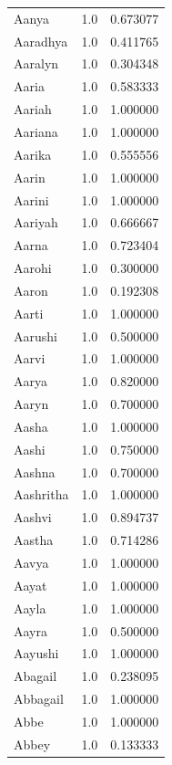 \documentclass[
  letterpaper,
  DIV=11,
  numbers=noendperiod]{scrreprt}
\begin{document}
\begin{tabular}{lrr}
Aanya           &   1.0 &   0.673077 \\
Aaradhya        &   1.0 &   0.411765 \\
Aaralyn         &   1.0 &   0.304348 \\
Aaria           &   1.0 &   0.583333 \\
Aariah          &   1.0 &   1.000000 \\
Aariana         &   1.0 &   1.000000 \\
Aarika          &   1.0 &   0.555556 \\
Aarin           &   1.0 &   1.000000 \\
Aarini          &   1.0 &   1.000000 \\
Aariyah         &   1.0 &   0.666667 \\
Aarna           &   1.0 &   0.723404 \\
Aarohi          &   1.0 &   0.300000 \\
Aaron           &   1.0 &   0.192308 \\
Aarti           &   1.0 &   1.000000 \\
Aarushi         &   1.0 &   0.500000 \\
Aarvi           &   1.0 &   1.000000 \\
Aarya           &   1.0 &   0.820000 \\
Aaryn           &   1.0 &   0.700000 \\
Aasha           &   1.0 &   1.000000 \\
Aashi           &   1.0 &   0.750000 \\
Aashna          &   1.0 &   0.700000 \\
Aashritha       &   1.0 &   1.000000 \\
Aashvi          &   1.0 &   0.894737 \\
Aastha          &   1.0 &   0.714286 \\
Aavya           &   1.0 &   1.000000 \\
Aayat           &   1.0 &   1.000000 \\
Aayla           &   1.0 &   1.000000 \\
Aayra           &   1.0 &   0.500000 \\
Aayushi         &   1.0 &   1.000000 \\
Abagail         &   1.0 &   0.238095 \\
Abbagail        &   1.0 &   1.000000 \\
Abbe            &   1.0 &   1.000000 \\
Abbey           &   1.0 &   0.133333 \\

\end{tabular}
\end{document}
